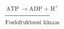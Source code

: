 \documentclass[preview]{standalone}
\begin{document}
\begin{align*}
\xrightarrow[\text{Fosfofruktoosi kinaas}]{\text{ATP}\: \rightarrow \text{ADP + H}^{+}}
\end{align*}
\end{document}
